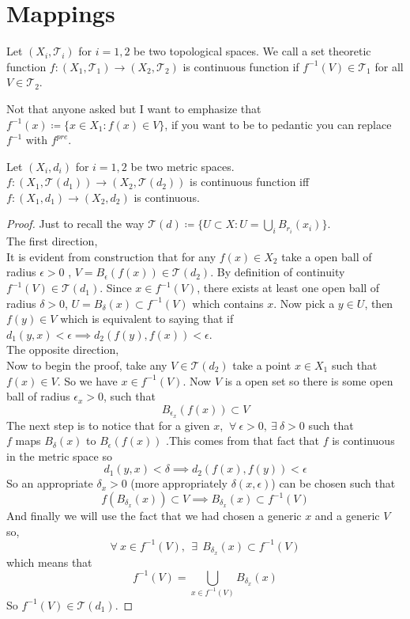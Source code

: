 \documentclass{scrartcl} %
\newcommand{\Tau}{\mathcal{T}}
\begin{document}
\section{Mappings}
\begin{definition}[Continuity]
Let $\left(X_i, \Tau_i\right)$ for $i = 1,2$ be 
two topological spaces. We call a set theoretic function
$f : \left(X_1, \Tau_1\right) \rightarrow
\left(X_2, \Tau_2\right)$ is continuous function if
$f^{-1}(V) \in \Tau_1$ for all $V \in \Tau_2$.
\end{definition}
Not that anyone asked but I want to emphasize that 
$f^{-1}(x) \coloneq \{x \in X_1 : f(x) \in V \}$, if 
you want to be to pedantic you can replace $f^{-1}$ with
$f^{pre}$.
\begin{theorem}
Let $\left(X_i, d_i\right)$ for $i = 1,2$ be 
two metric spaces.
$f : \left(X_1, \Tau(d_1)\right) \rightarrow
\left(X_2, \Tau(d_2)\right)$ is continuous function iff
$f : \left(X_1, d_1\right) \rightarrow
\left(X_2, d_2\right)$ is continuous.
\end{theorem}
\begin{proof}
Just to recall the way $\Tau(d) \coloneq \{ 
U \subset X : U = \bigcup_i B_{r_i} (x_i) \}$.\\
The first direction,\\
It is evident from construction that for any 
$f(x) \in X_2$ take a open ball of radius $\epsilon > 0$
, $V = B_{\epsilon}(f(x)) \in \Tau(d_2)$.
By definition of continuity $f^{-1}(V) \in 
\Tau(d_1)$. Since $x \in f^{-1}(V)$, there exists at least
one open ball of radius $\delta > 0$, $U = B_{\delta}(x)\subset
f^{-1}(V)$ which contains $x$. Now pick a $y \in U$, then $f(y) \in V$ which is 
 equivalent to saying that 
 if $d_1(y,x) < \epsilon \implies d_2(f(y),f(x)) < \epsilon$.\\
The opposite direction,\\
Now to begin the proof, take any $V \in \Tau(d_2)$
take a point $x \in
X_1$ such that $f(x) \in V$. So we have $x \in f^{-1}(V)
$. Now $V$ is a open set so there is some open ball
of radius $\epsilon_x > 0$, such that
\[
	B_{\epsilon_x}(f(x))\subset V 
\]
The next step is to notice that for a given $x$,
$\ \forall \ \epsilon > 0, \ \exists \ \delta > 0$
such that\\
$f$ maps  $B_{\delta}(x)$ to $B_{\epsilon}(f(x))$ 
.This comes
from that fact that $f$ is continuous in the metric space
so 
\[d_1(y,x) < \delta \implies d_2(f(x),f(y)) < \epsilon
\]
So an appropriate $\delta_x > 0$
(more appropriately $\delta(x, \epsilon)$) can be chosen such that
\[
f(B_{\delta_x}(x)) \subset V \implies
B_{\delta_x}(x) \subset f^{-1}(V)
\]
And finally we will use the fact that we had chosen a
generic $x$ and a generic $V$ so,
\[
	\forall\ x \in f^{-1}(V),\ \  
	\exists \ \ B_{\delta_x}(x) \subset f^{-1}(V) 
\]
which means that 
\[
	f^{-1}(V) = \bigcup\limits_{x \in f^{-1}(V)}
	B_{\delta_{x}}(x)
\]
So $f^{-1}(V) \in \Tau(d_1)$.
\end{proof}
\end{document}
